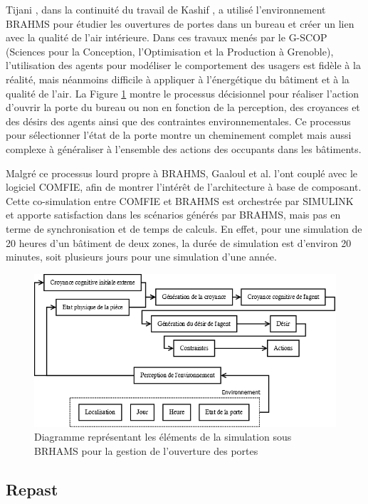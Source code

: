 Tijani \cite{Tijani-14}, dans la continuité du travail de Kashif \cite{Kashif-13}, a utilisé l'environnement BRAHMS pour étudier les ouvertures de portes dans un bureau et créer un lien avec la qualité de l'air intérieure. Dans ces travaux menés par le G-SCOP (Sciences pour la Conception, l'Optimisation et la Production à Grenoble), l'utilisation des agents pour modéliser le comportement des usagers est fidèle à la réalité, mais néanmoins difficile à appliquer à l'énergétique du bâtiment et à la qualité de l'air. La Figure \ref{fig:Diagramme_BRAHMS} montre le processus décisionnel pour réaliser l'action d'ouvrir la porte du bureau ou non en fonction de la perception, des croyances et des désirs des agents ainsi que des contraintes environnementales. Ce processus pour sélectionner l'état de la porte montre un cheminement complet mais aussi complexe à généraliser à l'ensemble des actions des occupants dans les bâtiments. 

Malgré ce processus lourd propre à BRAHMS, Gaaloul et al. \cite{Gaaloul-12} l'ont couplé avec le logiciel COMFIE, afin de montrer l'intérêt de l'architecture à base de composant. Cette co-simulation entre COMFIE et BRAHMS est orchestrée par SIMULINK et apporte satisfaction dans les scénarios générés par BRAHMS, mais pas en terme de synchronisation et de temps de calculs. En effet, pour une simulation de 20 heures d'un bâtiment de deux zones, la durée de simulation est d'environ 20 minutes, soit plusieurs jours pour une simulation d'une année. 

\begin{figure}
\centering
\includegraphics[scale=0.4]{Images/diagrammes_SMA/BRAHMS}
\caption{Diagramme représentant les éléments de la simulation sous BRHAMS pour la gestion de l'ouverture des portes}
\label{fig:Diagramme_BRAHMS}
\end{figure}

\subsection{Repast}

